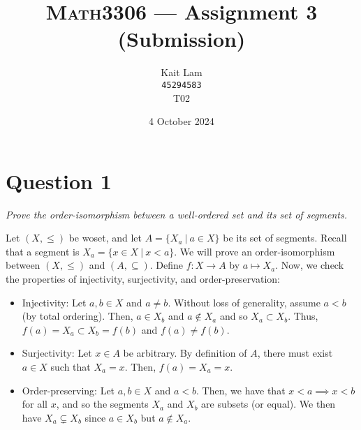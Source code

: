 \documentclass[a4paper]{article}
\author{Kait Lam \\ \small \texttt{45294583} \\ \small {T02}}
\title{\textsc{Math3306} --- Assignment 3 (Submission)}
\date{4 October 2024}
\begin{document}
\maketitle


\section*{Question 1}
\begin{center}
  \textit{Prove the order-isomorphism between a well-ordered set and its set of segments.}
\end{center}
Let $(X, \le)$ be woset, and let $A = \{X_a ~|~ a \in X\}$ be its set of segments.
Recall that a segment is $X_a = \{ x \in X ~|~ x < a \}$.
We will prove an order-isomorphism between $(X, \le)$ and $(A, \subseteq)$.
Define $f : X \to A$ by $a \mapsto X_a$.
Now, we check the properties of injectivity, surjectivity, and order-preservation:
\begin{itemize}
  \item 
    Injectivity: Let $a, b \in X$ and $a \ne b$. Without loss of generality,
    assume $a < b$ (by total ordering).
    Then, $a \in X_b$ and $a \notin X_a$ and so $X_a \subset X_b$. 
    Thus,
    $f(a) = X_a \subset X_b = f(b)$ and $f(a) \ne f(b)$.

  \item Surjectivity:
    Let $x \in A$ be arbitrary. By definition of $A$, there must exist $a \in X$ such that $X_a = x$.
    Then, $f(a) = X_a = x$.

  \item Order-preserving:
    Let $a, b \in X$ and $a < b$.
    Then, we have that $x < a \implies x < b$ for all $x$,
    and so the segments $X_a$ and $X_b$ are subsets (or equal).
    We then have $X_a \subsetneq X_b$ since $a \in X_b$ but $a \notin X_a$.
\end{itemize}
\end{document}
